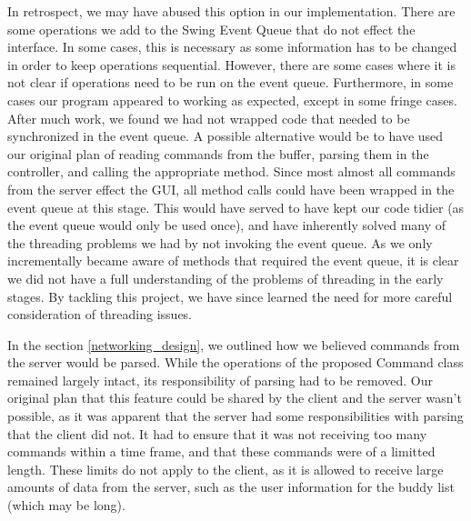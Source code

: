 In retrospect, we may have abused this option in our implementation. There are some operations we add to the Swing Event Queue that do not effect the interface. In some cases, this is necessary as some information has to be changed in order to keep operations sequential. However, there are some cases where it is not clear if operations need to be run on the event queue. Furthermore, in some cases our program appeared to working as expected, except in some fringe cases. After much work, we found we had not wrapped code that needed to be synchronized in the event queue. A possible alternative would be to have used our original plan of reading commands from the buffer, parsing them in the controller, and calling the appropriate method. Since most almost all commands from the server effect the GUI, all method calls could have been wrapped in the event queue at this stage. This would have served to have kept our code tidier (as the event queue would only be used once), and have inherently solved many of the threading problems we had by not invoking the event queue. As we only incrementally became aware of methods that required the event queue, it is clear we did not have a full understanding of the problems of threading in the early stages. By tackling this project, we have since learned the need for more careful consideration of threading issues.

In the section \ref{networking_design}, we outlined how we believed commands from the server would be parsed. While the operations of the proposed Command class remained largely intact, its responsibility of parsing had to be removed. Our original plan that this feature could be shared by the client and the server wasn't possible, as it was apparent that the server had some responsibilities with parsing that the client did not. It had to ensure that it was not receiving too many commands within a time frame, and that these commands were of a limitted length. These limits do not apply to the client, as it is allowed to receive large amounts of data from the server, such as the user information for the buddy list (which may be long).

